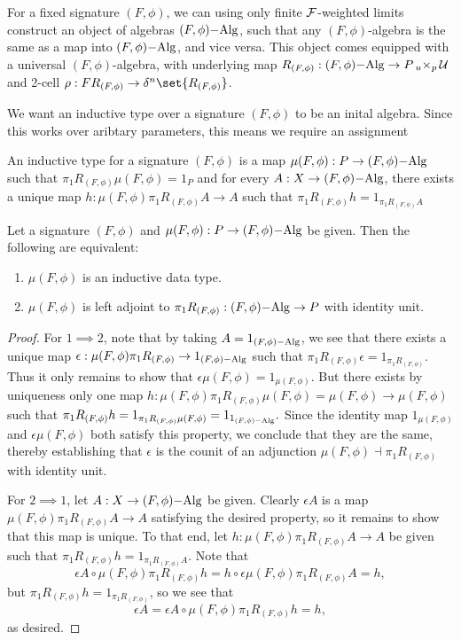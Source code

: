 \documentclass[../thesis.tex]{subfiles}
\begin{document}
\begin{remark}
  For a fixed signature $(F,\phi)$, we can using only finite $\cF$-weighted limits construct an object
  of algebras $(F,\phi)\Alg$, such that any $(F,\phi)$-algebra is the same as a map into $(F,\phi)\Alg$,
  and vice versa. This object comes equipped with a universal $(F,\phi)$-algebra, with underlying map
  $R_{(F,\phi)} : (F,\phi) \Alg \to P \pb[u]{p} \cU$ and 2-cell $\rho : F R_{(F,\phi)} \to \delta^n\set
  {R_{(F,\phi)}}$.
\end{remark}

We want an inductive type over a signature $(F,\phi)$ to be an inital algebra. Since this works over
aribtary parameters, this means we require an assignment 

\begin{definition}
  An inductive type for a signature $(F,\phi)$ is a map $\mu(F,\phi) : P \to (F,\phi)\Alg$ such that
  $\pi_1 R_{(F,\phi)} \mu(F,\phi) = 1_P$ and for every $A : X \to (F,\phi)\Alg$, there exists a unique
  map $h : \mu(F,\phi)\pi_1R_{(F,\phi)} A \to A$ such that $\pi_1R_{(F,\phi)} h = 1_{\pi_1R_{(F,\phi)}A}$
\end{definition}
\begin{lemma}
  Let a signature $(F,\phi)$ and $\mu(F,\phi) : P \to (F,\phi)\Alg$ be given. Then the following are equivalent:
  \begin{enumerate}
    \item $\mu(F,\phi)$ is an inductive data type.
    \item $\mu(F,\phi)$ is left adjoint to $\pi_1 R_{(F,\phi)} : (F,\phi)\Alg \to P$ with identity unit.
  \end{enumerate}
\end{lemma}
\begin{proof}
  For $1 \implies 2$, note that by taking $A = 1_{(F,\phi)\Alg}$, we see that there exists a unique map $
  \epsilon : \mu(F,\phi)\pi_1R_{(F,\phi)} \to 1_{(F,\phi)\Alg}$ such that $\pi_1 R_{(F,\phi)}\epsilon =
  1_{\pi_1 R_{(F,\phi)}}$. Thus it only remains to show that $\epsilon\mu(F,\phi) = 1_{\mu(F,\phi)}$. But
  there exists by uniqueness only one map $h : \mu(F,\phi)\pi_1R_{(F,\phi)}\mu(F,\phi) = \mu(F,\phi) \to
  \mu(F,\phi)$ such that $\pi_1 R_{(F,\phi)} h = 1_{\pi_1 R_{(F,\phi)}\mu(F,\phi)} = 1_{1_{(F,\phi)\Alg}}.$
  Since the identity map $1_{\mu(F,\phi)}$ and $\epsilon\mu(F,\phi)$ both satisfy this property, we conclude
  that they are the same, thereby establishing that $\epsilon$ is the counit of an adjunction $\mu(F,\phi)
  \dashv \pi_1R_{(F,\phi)}$ with identity unit.

  For $2 \implies 1$, let $A : X \to (F,\phi)\Alg$ be given. Clearly $\epsilon A$ is a map $\mu(F,\phi)\pi_1
  R_{(F,\phi)}A \to A$ satisfying the desired property, so it remains to show that this map is unique. To that
  end, let $h : \mu(F,\phi)\pi_1R_{(F,\phi)}A \to A$ be given such that $\pi_1R_{(F,\phi)}h = 1_{\pi_1R_{(F,
  \phi)}A}$. Note that
  \[\epsilon A \circ \mu(F,\phi) \pi_1 R_{(F,\phi)} h = h \circ \epsilon \mu(F,\phi)\pi_1 R_{(F,\phi)}A = h,\]
  but $\pi_1 R_{(F,\phi)} h = 1_{\pi_1 R_{(F,\phi)}}$, so we see that
  \[\epsilon A = \epsilon A \circ \mu(F,\phi)\pi_1 R_{(F,\phi)} h = h,\]
  as desired.
\end{proof}
\end{document}
